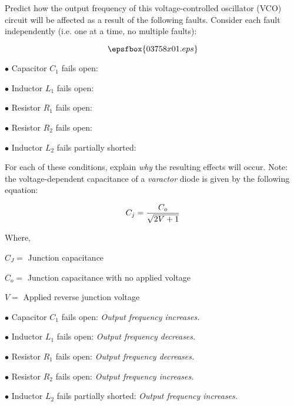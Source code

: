 

Predict how the output frequency of this voltage-controlled oscillator (VCO) circuit will be affected as a result of the following faults.  Consider each fault independently (i.e. one at a time, no multiple faults):

$$\epsfbox{03758x01.eps}$$

\medskip
\item{$\bullet$} Capacitor $C_1$ fails open:
\vskip 5pt
\item{$\bullet$} Inductor $L_1$ fails open:
\vskip 5pt
\item{$\bullet$} Resistor $R_1$ fails open:
\vskip 5pt
\item{$\bullet$} Resistor $R_2$ fails open:
\vskip 5pt
\item{$\bullet$} Inductor $L_2$ fails partially shorted:
\medskip

\vskip 10pt

For each of these conditions, explain {\it why} the resulting effects will occur.  Note: the voltage-dependent capacitance of a {\it varactor} diode is given by the following equation:

$$C_j = {C_o \over {\sqrt{2V + 1}}}$$

\noindent
Where,

$C_J =$ Junction capacitance

$C_o =$ Junction capacitance with no applied voltage

$V = $ Applied reverse junction voltage 

\vskip 10pt







\medskip
\item{$\bullet$} Capacitor $C_1$ fails open: {\it Output frequency increases.}
\vskip 5pt
\item{$\bullet$} Inductor $L_1$ fails open: {\it Output frequency decreases.}
\vskip 5pt
\item{$\bullet$} Resistor $R_1$ fails open: {\it Output frequency decreases.}
\vskip 5pt
\item{$\bullet$} Resistor $R_2$ fails open: {\it Output frequency increases.}
\vskip 5pt
\item{$\bullet$} Inductor $L_2$ fails partially shorted: {\it Output frequency increases.}
\medskip

